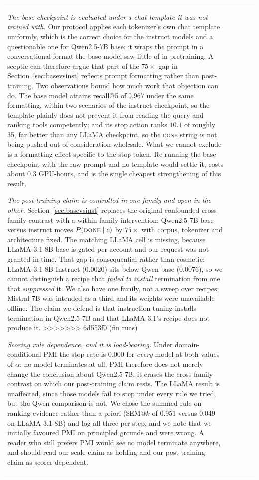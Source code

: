 \documentclass[11pt]{article}
\newcommand{\done}{\ensuremath{\text{\textsc{done}}}}
\begin{document}
\begin{table}[t]
\begin{tabular}{lcccc}
\emph{The base checkpoint is evaluated under a chat template it was not trained
with.} Our protocol applies each tokenizer's own chat template uniformly, which
is the correct choice for the instruct models and a questionable one for
Qwen2.5-7B base: it wraps the prompt in a conversational format the base model saw
little of in pretraining. A sceptic can therefore argue that part of the
$75\times$ gap in Section~\ref{sec:basevsinst} reflects prompt formatting rather
than post-training. Two observations bound how much work that objection can do.
The base model attains recall@5 of $0.967$ under the same formatting, within two
scenarios of the instruct checkpoint, so the template plainly does not prevent it
from reading the query and ranking tools competently; and its stop action ranks
$10.1$ of roughly 35, far better than any LLaMA checkpoint, so the \textsc{done}
string is not being pushed out of consideration wholesale. What we cannot exclude
is a formatting effect specific to the stop token. Re-running the base checkpoint
with the raw prompt and no template would settle it, costs about $0.3$ GPU-hours,
and is the single cheapest strengthening of this result.

\emph{The post-training claim is controlled in one family and open in the other.}
Section~\ref{sec:basevsinst} replaces the original confounded cross-family
contrast with a within-family intervention: Qwen2.5-7B base versus instruct moves
$P(\done\mid c)$ by $75\times$ with corpus, tokenizer and architecture fixed. The
matching LLaMA cell is missing, because LLaMA-3.1-8B base is gated per account and
our request was not granted in time. That gap is consequential rather than
cosmetic: LLaMA-3.1-8B-Instruct ($0.0020$) sits below Qwen base ($0.0076$), so we
cannot distinguish a recipe that \emph{failed to install} termination from one that
\emph{suppressed} it. We also have one family, not a sweep over recipes;
Mistral-7B was intended as a third and its weights were unavailable offline. The
claim we defend is that instruction tuning installs termination in Qwen2.5-7B and
that LLaMA-3.1's recipe does not produce it.
>>>>>>> 6d553f0 (fin runs)

\emph{Scoring rule dependence, and it is load-bearing.} Under domain-conditional
PMI the stop rate is 0.000 for \emph{every} model at both values of $\alpha$: no
model terminates at all. PMI therefore does not merely change the conclusion about
Qwen2.5-7B, it erases the cross-family contrast on which our post-training claim
rests. The LLaMA result is unaffected, since those models fail to stop under every
rule we tried, but the Qwen comparison is not. We chose the summed rule on ranking
evidence rather than a priori (SEM@$k$ of 0.951 versus 0.049 on LLaMA-3.1-8B) and
log all three per step, and we note that we initially favoured PMI on principled
grounds and were wrong. A reader who still prefers PMI would see no model
terminate anywhere, and should read our scale claim as holding and our
post-training claim as scorer-dependent.


\end{tabular}
\end{table}
\end{document}
